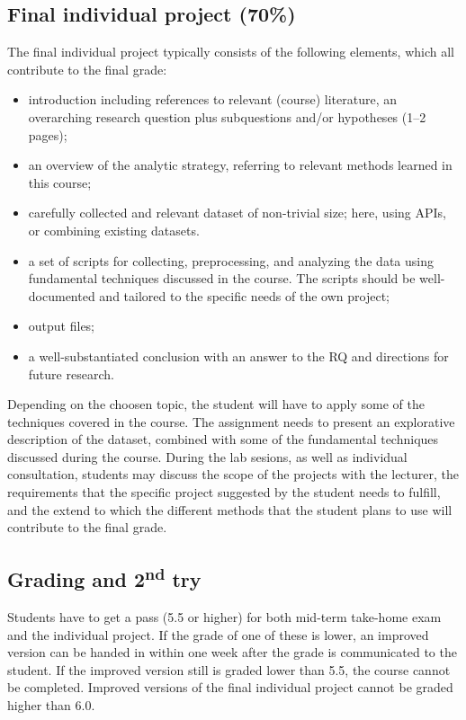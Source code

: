 \subsection*{Final individual project (70\%)}
The final individual project typically consists of the following elements, which all contribute to the final grade:
\begin{itemize}
\item introduction including references to relevant (course) literature, an overarching research question plus subquestions and/or hypotheses (1–2 pages);
\item an overview of the analytic strategy, referring to relevant methods learned in this course;
\item carefully collected and relevant dataset of non-trivial size; here, using APIs, or combining existing datasets. 
\item a set of scripts for collecting, preprocessing, and analyzing the data using fundamental techniques discussed in the course. The scripts should be well-documented and tailored to the specific needs of the own project;
\item output files;
\item a well-substantiated conclusion with an answer to the RQ and directions for future research.
\end{itemize}

Depending on the choosen topic, the student will have to apply some of the techniques covered in the course. The assignment needs to present an explorative description of the dataset, combined with some of the fundamental techniques discussed during the course. During the lab sesions, as well as individual consultation, students may discuss the scope of the projects with the lecturer, the requirements that the specific project suggested by the student needs to fulfill, and the extend to which the different methods that the student plans to use will contribute to the final grade.

\subsection*{Grading and 2\textsuperscript{nd} try}
Students have to get a pass (5.5 or higher) for both mid-term take-home exam and the individual project. If the grade of one of these is lower, an improved version can be handed in within one week after the grade is communicated to the student. If the improved version still is graded lower than 5.5, the course cannot be completed. Improved versions of the final individual project cannot be graded higher than 6.0. 

